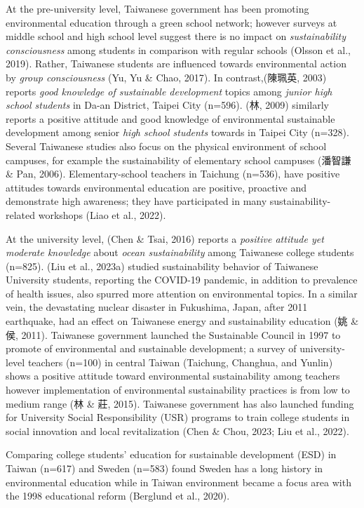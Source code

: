 \documentclass[
  letterpaper,
  DIV=11,
  numbers=noendperiod]{scrartcl}
\begin{document}
At the pre-university level, Taiwanese government has been promoting
environmental education through a green school network; however surveys
at middle school and high school level suggest there is no impact on
\emph{sustainability consciousness} among students in comparison with
regular schools (Olsson et al., 2019). Rather, Taiwanese students are
influenced towards environmental action by \emph{group consciousness}
(Yu, Yu \& Chao, 2017). In contrast,(陳珮英, 2003) reports \emph{good
knowledge of sustainable development} topics among \emph{junior high
school students} in Da-an District, Taipei City (n=596). (林, 2009)
similarly reports a positive attitude and good knowledge of
environmental sustainable development among senior \emph{high school
students} towards in Taipei City (n=328). Several Taiwanese studies also
focus on the physical environment of school campuses, for example the
sustainability of elementary school campuses (潘智謙 \& Pan, 2006).
Elementary-school teachers in Taichung (n=536), have positive attitudes
towards environmental education are positive, proactive and demonstrate
high awareness; they have participated in many sustainability-related
workshops (Liao et al., 2022).

At the university level, (Chen \& Tsai, 2016) reports a \emph{positive
attitude yet moderate knowledge} about \emph{ocean sustainability} among
Taiwanese college students (n=825). (Liu et al., 2023a) studied
sustainability behavior of Taiwanese University students, reporting the
COVID-19 pandemic, in addition to prevalence of health issues, also
spurred more attention on environmental topics. In a similar vein, the
devastating nuclear disaster in Fukushima, Japan, after 2011 earthquake,
had an effect on Taiwanese energy and sustainability education (姚 \&
侯, 2011). Taiwanese government launched the Sustainable Council in 1997
to promote of environmental and sustainable development; a survey of
university-level teachers (n=100) in central Taiwan (Taichung, Changhua,
and Yunlin) shows a positive attitude toward environmental
sustainability among teachers however implementation of environmental
sustainability practices is from low to medium range (林 \& 莊, 2015).
Taiwanese government has also launched funding for University Social
Responsibility (USR) programs to train college students in social
innovation and local revitalization (Chen \& Chou, 2023; Liu et al.,
2022).

Comparing college students' education for sustainable development (ESD)
in Taiwan (n=617) and Sweden (n=583) found Sweden has a long history in
environmental education while in Taiwan environment became a focus area
with the 1998 educational reform (Berglund et al., 2020).
\end{document}
